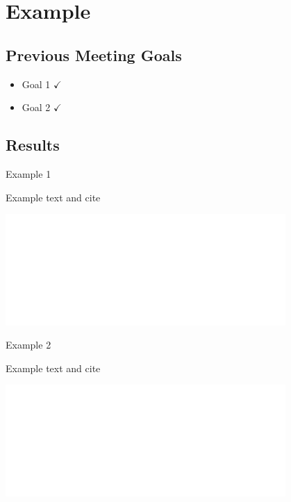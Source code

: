 \section{Example}



\subsection{Previous Meeting Goals}
\begin{frame}{}
\centering
\begin{minipage}{0.6\textwidth}
		\begin{itemize}
        \centering
			\item Goal 1 $\checkmark$
			\item Goal 2 $\checkmark$
		\end{itemize}
	\end{minipage}
\end{frame}



\subsection{Results}
\begin{frame}{Example 1}
    \begin{minipage}{0.5\textwidth}
    Example text and cite \cite{article}
    \end{minipage}%
    \colorbox{blue!20}{\begin{minipage}{0.5\textwidth}
        \includegraphics[width=0.8\textwidth]{_Example/Images/tud_white.pdf}   
    \end{minipage}}
\end{frame}

\begin{frame}{Example 2}
\begin{minipage}{0.5\textwidth}
	Example text and cite \cite{article}
\end{minipage}%
\colorbox{red!20}{\begin{minipage}{0.5\textwidth}
		\includegraphics[width=0.8\textwidth]{_Example/Images/tud_white.pdf}   
\end{minipage}}
\end{frame}




